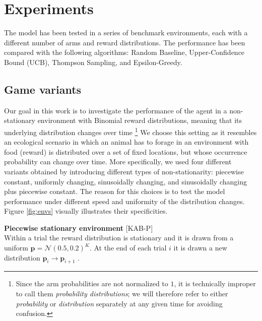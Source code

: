 \section{Experiments}

The model has been tested in a series of benchmark environments, each with a different number of arms and reward distributions. The performance has been compared with the following algorithms: Random Baseline, Upper-Confidence Bound (UCB), Thompson Sampling, and Epsilon-Greedy.

\subsection{Game variants}\label{sec:envs}

\noindent Our goal in this work is to investigate the performance of the agent in a non-stationary environment with Binomial reward distributions, meaning that its underlying distribution changes over time \footnote{Since the arm probabilities are not normalized to $1$, it is
technically improper to call them \textit{probability distributions}; we will therefore refer to either \textit{probability} or \textit{distribution} separately at any given time for avoiding confusion.}
We choose this setting as it resembles an ecological scenario in which an animal has to forage in an environment with food (reward) is distributed over a set of fixed locations, but whose occurrence probability can change over time.
More specifically, we used four different variants obtained by introducing different types of non-stationarity: piecewise constant, uniformly changing, sinusoidally changing, and sinusoidally changing plus piecewise constant.
The reason for this choices is to test the model performance under different speed and uniformity of the distribution changes.
Figure \ref{fig:envs} visually illustrates their specificities.

\hfill \break
\noindent \textbf{Piecewise stationary environment} [\textsc{KAB-P}]\\ Within a trial the reward distribution is stationary and it is drawn from a uniform $\mathbf{p}=\mathcal{N}(0.5, 0.2)^{K}$. At the end of each trial $i$ it is drawn a new distribution $\mathbf{\mathbf{p}}_{i} \to \mathbf{\mathbf{p}}_{i+1}$ \cite{qiForcedExplorationBandit2023}.


